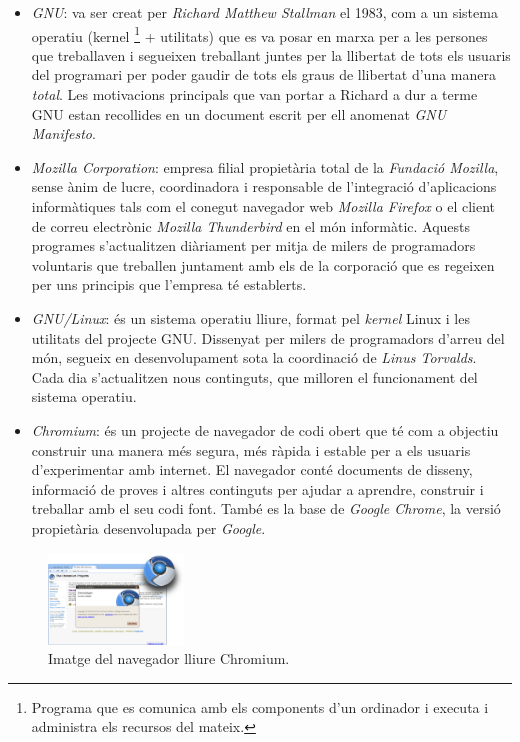 \begin{itemize}

\item \emph{GNU}: va ser creat per \emph{Richard Matthew Stallman} el 1983, com a un sistema operatiu (kernel \footnote{Programa que es comunica amb els components d'un ordinador i executa i administra els recursos del mateix.} + utilitats) que es va posar en marxa per a les persones que treballaven i segueixen treballant juntes per la llibertat de tots els usuaris del programari per poder gaudir de tots els graus de llibertat d'una manera \emph{total}. Les motivacions principals que van portar a Richard a dur a terme GNU estan recollides en un document escrit per ell anomenat \emph{GNU Manifesto}. \cite{GNUExit} \cite{GNUExitII} \cite{GnuMan} \cite{GvsM}

\item \emph{Mozilla Corporation}: empresa filial propietària total de la \emph{Fundació Mozilla}, sense ànim de lucre, coordinadora i responsable de l'integració d'aplicacions informàtiques tals com el conegut navegador web \emph{Mozilla Firefox} o el client de correu electrònic \emph{Mozilla Thunderbird} en el món informàtic. Aquests programes s'actualitzen diàriament per mitja de milers de programadors voluntaris que treballen juntament amb els de la corporació que es regeixen per uns principis que l'empresa té establerts. \cite{MozExit} \cite{MozExitII} \cite{MozFesto}

\item \emph{GNU/Linux}: és un sistema operatiu lliure, format pel \emph{kernel} Linux i les utilitats del projecte GNU. Dissenyat per milers de programadors d'arreu del món, segueix en desenvolupament sota la coordinació de \emph{Linus Torvalds}. Cada dia s'actualitzen nous continguts, que milloren el funcionament del sistema operatiu. \cite{LinExit} \cite{POSIX}

\item \emph{Chromium}: és un projecte de navegador de codi obert que té com a objectiu construir una manera més segura, més ràpida i estable per a els usuaris d'experimentar amb internet. El navegador conté documents de disseny, informació de proves i altres continguts per ajudar a aprendre, construir i treballar amb el seu codi font. També es la base de \emph{Google Chrome}, la versió propietària desenvolupada per \emph{Google}. \cite{Chrom} 
\end{itemize}

\begin{figure}[ht!]
\centering
\includegraphics[width=36mm]{data/chromium.png}
\caption{Imatge del navegador lliure Chromium.}
\label{chromium}
\end{figure}
